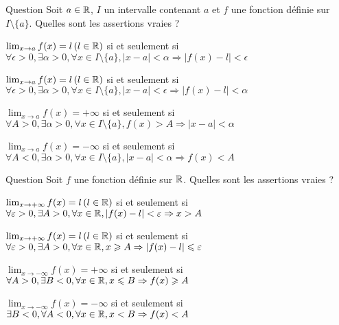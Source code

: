\begin{multi}[multiple,feedback=
{Voir la définition d'une limite finie ou infinie en un point \(a\in\Rr\) :
\(\lim_{x\to a} f(x)=l\) si et seulement si  \(\forall \epsilon >0,  \exists \alpha > 0, \forall x \in I\setminus\{a\}, |x-a| < \alpha \Rightarrow |f(x)-l|<\epsilon\)
\(\lim_{x\to a} f(x)=-\infty\) si et seulement si \(\forall A < 0,  \exists \alpha > 0, \forall x \in I\setminus\{a\}, |x-a| < \alpha \Rightarrow f(x) < A\)
}]{Question}
Soit \(a\in \Rr\), \(I\) un intervalle contenant \(a\) et \(f\) une fonction définie sur \(I \setminus\{a\}\). Quelles sont les assertions vraies ?

    \item* \(\lim_{x\to a} f(x)=l \, (l\in \mathbb{R})\) si et seulement si  \(\forall \epsilon >0,  \exists \alpha > 0, \forall x \in I\setminus\{a\}, |x-a| < \alpha \Rightarrow |f(x)-l|<\epsilon\)
    \item \(\lim_{x\to a} f(x)=l \, (l\in \mathbb{R})\) si et seulement si \(\forall \epsilon >0,  \exists \alpha > 0, \forall x  \in I\setminus\{a\}, |x-a|<\epsilon \Rightarrow |f(x)-l|<\alpha \)
    \item \(\lim_{x\to a} f(x)=+\infty\) si et seulement si \(\forall A > 0,  \exists \alpha > 0, \forall x \in I\setminus\{a\}, f(x) > A \Rightarrow |x-a| < \alpha\)
    \item* \(\lim_{x\to a} f(x)=-\infty\) si et seulement si \(\forall A < 0,  \exists \alpha > 0, \forall x \in I\setminus\{a\}, |x-a| < \alpha \Rightarrow f(x) < A\)
\end{multi}


\begin{multi}[multiple,feedback=
{Voir la définition d'une limite en \(+\infty\) ou \(-\infty\) vers une valeur finie ou infinie :
\(\lim_{x\to +\infty} f(x)=l \, (l\in \Rr)\)  si et seulement si \(\forall \epsilon >0,  \exists A >0, \forall x \in \Rr, x\ge A \Rightarrow |f(x)-l|\le \epsilon\)
\(\lim_{x\to -\infty} f(x)=+\infty\)  si et seulement si \( \forall A >0,  \exists B <0, \forall x \in \Rr, x\le B \Rightarrow f(x)\ge A\)
}]{Question}
Soit  \(f\) une fonction définie sur \(\mathbb{R}\). Quelles sont les assertions vraies ?

    \item \(\lim_{x\to +\infty} f(x)=l \, (l\in \Rr)\)  si et seulement si \( \forall \varepsilon >0,  \exists A >0, \forall x \in \mathbb{R}, |f(x)-l|<\varepsilon \Rightarrow x>A\)
    \item* \(\lim_{x\to +\infty} f(x)=l \, (l\in \Rr)\)  si et seulement si \(\forall \epsilon >0,  \exists A >0, \forall x \in \Rr, x\ge A \Rightarrow |f(x)-l|\le \epsilon\)
    \item* \(\lim_{x\to -\infty} f(x)=+\infty\)  si et seulement si \( \forall A >0,  \exists B <0, \forall x \in \Rr, x\le B \Rightarrow f(x)\ge A\)
    \item \(\lim_{x\to -\infty} f(x)=-\infty\)  si et seulement si \(  \exists B<0, \forall A < 0,   \forall x \in \mathbb{R}, x < B \Rightarrow f(x) < A\)
\end{multi}


